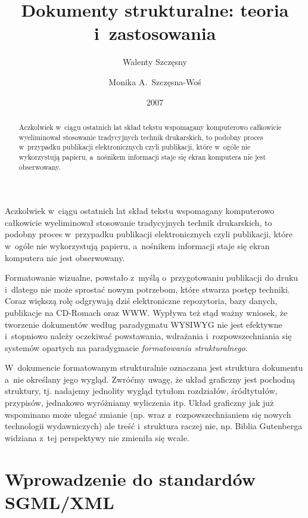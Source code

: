 \documentclass[skorowidz,palatino,brudnopis,xodstep]{wimgr}
\author   {Walenty Szczęsny}
\author   {Monika A.~Szczęsna-Woś}
\title    {Dokumenty strukturalne: teoria i~zastosowania}
\date     {2007}
\begin{document}
\begin{abstract}
  Aczkolwiek w~ciągu ostatnich lat skład tekstu wspomagany komputerowo
  całkowicie wyeliminował stosowanie tradycyjnych technik drukarskich,
  to podobny proces w~przypadku publikacji elektronicznych czyli
  publikacji, które w~ogóle nie wykorzystują papieru, a~nośnikem
  informacji staje się ekran komputera nie jest obserwowany.
\end{abstract}

\maketitle
%
\introduction

Aczkolwiek w~ciągu ostatnich lat skład tekstu wspomagany
komputerowo całkowicie wyeliminował stosowanie tradycyjnych technik
drukarskich, to podobny proces w~przypadku publikacji elektronicznych
czyli publikacji, które w~ogóle nie wykorzystują papieru, a~nośnikem
informacji staje się ekran komputera nie jest obserwowany.

Formatowanie wizualne, powstało z~myślą o~przygotowaniu publikacji do
druku i~dlatego nie może sprostać nowym potrzebom, które stwarza
postęp techniki. Coraz większą rolę odgrywają dziś elektroniczne
repozytoria, bazy danych, publikacje na CD-Romach oraz WWW.  Wypływa
też stąd ważny wniosek, że tworzenie dokumentów według paradygmatu
WYSIWYG nie jest efektywne i~stopniowo należy oczekiwać powstawania,
wdrażania i~rozpowszechniania się systemów opartych na paradygmacie
\emph{formatowania strukturalnego}.

W~dokumencie formatowanym strukturalnie oznaczana jest struktura
dokumentu a~nie określany jego wygląd. Zwróćmy uwagę, że układ
graficzny jest pochodną struktury, tj. nadajemy jednolity wygląd
tytułom rozdziałów, śródtytułów, przypisów, jednakowo wyróżniamy
wyliczenia itp.  Układ graficzny jak już wspominano może ulegać zmianie
(np. wraz z~rozpowszechnianiem się nowych technologii wydawniczych)
ale treść i~struktura raczej nie, np. Biblia Gutenberga widziana z~tej
perspektywy nie zmieniła się wcale.

\chapter{Wprowadzenie do standardów SGML/XML}
\end{document}
